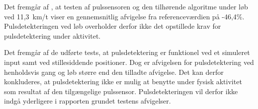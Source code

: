 Det fremgår af , at testen af pulssensoren og den tilhørende algoritme under løb ved 11,3~km/t viser en gennemsnitlig afvigelse fra referenceværdien på -46,4\%. Pulsdetekteringen ved løb overholder derfor ikke det opstillede krav for pulsdetektering under aktivitet.

Det fremgår af de udførte tests, at pulsdetektering er funktionel ved et simuleret input samt ved stillesiddende positioner. Dog er afvigelsen for pulsdetektering ved henholdsvis gang og løb større end den tilladte afvigelse. Det kan derfor konkluderes, at pulsdetektering ikke er mulig at benytte under fysisk aktivitet som resultat af den tilgængelige pulssensor. Pulsdetekteringen vil derfor ikke indgå yderligere i rapporten grundet testens afvigelser.